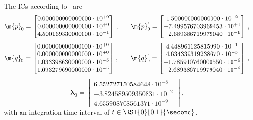 %
The \acp{IC} according to~\cite{lioen1998test, mazzia2008test} are
%
\begin{equation*}
  \m{p}_{0} = \begin{bmatrix}
    0.000000000000000\cdot10^{+0} \\
    0.000000000000000\cdot10^{+0} \\
    4.500169330000000\cdot10^{-1}
  \end{bmatrix} \, \text{,} \qquad
  \m{p}^{\prime}_{0} = \begin{bmatrix}
     1.500000000000000\cdot10^{+2} \\
    -7.499576703969453\cdot10^{+1} \\
    -2.689386719979040\cdot10^{-6}
  \end{bmatrix} \, \text{,}
\end{equation*}
\begin{equation*}
  \m{q}_{0} = \begin{bmatrix}
    0.000000000000000\cdot10^{+0} \\
    0.000000000000000\cdot10^{+0} \\
    1.033398630000000\cdot10^{-5} \\
    1.693279690000000\cdot10^{-5}
  \end{bmatrix} \, \text{,} \qquad
  \m{q}^{\prime}_{0} = \begin{bmatrix}
     4.448961125815990\cdot10^{-1} \\
     4.634339319238670\cdot10^{-3} \\
    -1.785910760000550\cdot10^{-6} \\
    -2.689386719979040\cdot10^{-6}
  \end{bmatrix} \, \text{,}
\end{equation*}
\begin{equation*}
  \bm{\lambda}_{0} = \begin{bmatrix}
     6.552727150584648\cdot10^{-8} \\
    -3.824589509350831\cdot10^{+2} \\
     4.635908708561371\cdot10^{-9}
  \end{bmatrix} \, \text{,}
\end{equation*}
%
with an integration time interval of $t \in \RSI{0}{0.1}{\second}$.

